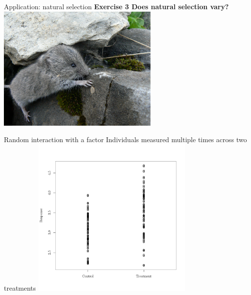 \documentclass{beamer}
\begin{document}
\begin{frame}{Application: natural selection}
 \centering
    \textbf{Exercise 3 Does natural selection vary?}
 \includegraphics[width=0.6\textwidth]{figure/cutevole}
 
\end{frame}


\begin{frame}{Random interaction with a factor}
Individuals measured multiple times across two treatments
 \centering
 \includegraphics[width=0.6\textwidth]{figure/randfactor-1}
\end{frame}
\end{document}
